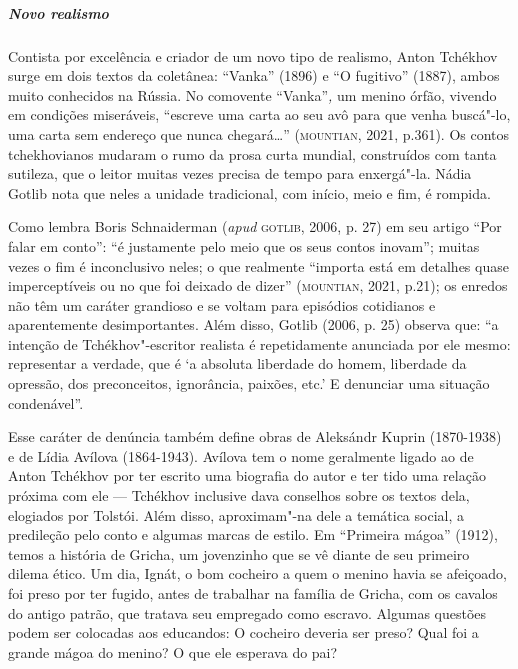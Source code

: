\documentclass[11pt]{extarticle}
\begin{document}


\subparagraph{Novo realismo}
Contista por excelência e criador de um novo tipo de realismo, Anton
Tchékhov surge em dois textos da coletânea: ``Vanka'' (1896) e ``O
fugitivo'' (1887), ambos muito conhecidos na Rússia. No comovente
``Vanka''\emph{,} um menino órfão, vivendo em condições miseráveis,
``escreve uma carta ao seu avô para que venha buscá"-lo, uma carta sem
endereço que nunca chegará\ldots{}'' (\textsc{mountian}, 2021, p.361). Os contos
tchekhovianos mudaram o rumo da prosa curta mundial, construídos com
tanta sutileza, que o leitor muitas vezes precisa de tempo para
enxergá"-la. Nádia Gotlib nota que neles a unidade tradicional, com
início, meio e fim, é rompida.

Como lembra Boris Schnaiderman
(\emph{apud} \textsc{gotlib}, 2006, p. 27) em seu artigo ``Por falar em conto'':
``é justamente pelo meio que os seus contos inovam''; muitas vezes o fim
é inconclusivo neles; o que realmente ``importa está em detalhes quase
imperceptíveis ou no que foi deixado de dizer'' (\textsc{mountian}, 2021, p.21);
os enredos não têm um caráter grandioso e se voltam para episódios
cotidianos e aparentemente desimportantes. Além disso, Gotlib (2006, p.
25) observa que: ``a intenção de Tchékhov"-escritor realista é
repetidamente anunciada por ele mesmo: representar a verdade, que é `a
absoluta liberdade do homem, liberdade da opressão, dos preconceitos,
ignorância, paixões, etc.' E denunciar uma situação condenável''.


Esse caráter de denúncia também define obras de Aleksándr Kuprin
(1870-1938) e de Lídia Avílova (1864-1943). Avílova tem o nome
geralmente ligado ao de Anton Tchékhov por ter escrito uma biografia do
autor e ter tido uma relação próxima com ele --- Tchékhov inclusive dava
conselhos sobre os textos dela, elogiados por Tolstói. Além disso,
aproximam"-na dele a temática social, a predileção pelo conto e algumas
marcas de estilo. Em ``Primeira mágoa'' (1912), temos a história
de Gricha, um jovenzinho que se vê diante de seu primeiro dilema ético.
Um dia, Ignát, o bom cocheiro a quem o menino havia se afeiçoado, foi
preso por ter fugido, antes de trabalhar na família de Gricha, com os
cavalos do antigo patrão, que tratava seu empregado como escravo.
Algumas questões podem ser colocadas aos educandos: O cocheiro deveria
ser preso? Qual foi a grande mágoa do menino? O que ele esperava do pai?
\end{document}
